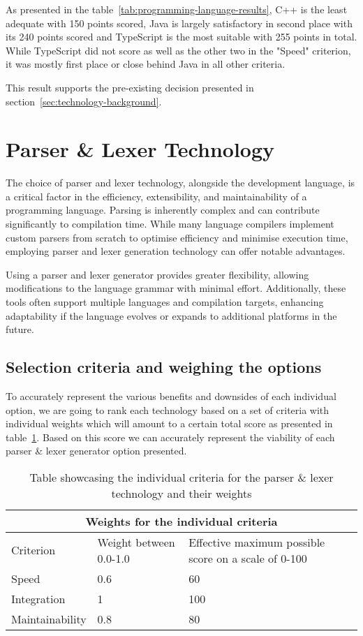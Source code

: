 As presented in the table~\ref{tab:programming-language-results}, C++ is the least adequate with 150 points scored, Java is largely satisfactory in second place with its 240 points scored and TypeScript is the most suitable with 255 points in total. While TypeScript did not score as well as the other two in the "Speed" criterion, it was mostly first place or close behind Java in all other criteria. 

This result supports the pre-existing decision presented in section~\ref{sec:technology-background}.

\section{Parser \& Lexer Technology}

The choice of parser and lexer technology, alongside the development language, is a critical factor in the efficiency, extensibility, and maintainability of a programming language. Parsing is inherently complex and can contribute significantly to compilation time. While many language compilers implement custom parsers from scratch to optimise efficiency and minimise execution time, employing parser and lexer generation technology can offer notable advantages.

Using a parser and lexer generator provides greater flexibility, allowing modifications to the language grammar with minimal effort. Additionally, these tools often support multiple languages and compilation targets, enhancing adaptability if the language evolves or expands to additional platforms in the future.

\subsection{Selection criteria and weighing the options}
\label{sec:parser-and-lexer-technology-selection-criteria}

To accurately represent the various benefits and downsides of each individual option, we are going to rank each technology based on a set of criteria with individual weights which will amount to a certain total score as presented in table~\ref{tab:parser-and-lexer-technology-selection-criteria}. Based on this score we can accurately represent the viability of each parser \& lexer generator option presented.

\begin{table}[H]
	\centering
	\begin{tabular}{ |p{4cm}|p{5cm}|p{5cm}|  }
		\hline
		\multicolumn{3}{|c|}{Weights for the individual criteria} \\
		\hline
		Criterion&Weight between 0.0-1.0&Effective maximum possible score on a scale of 0-100\\
		\hline
		Speed&0.6&60\\
		Integration&1&100\\
		Maintainability&0.8&80\\
		\hline
	\end{tabular}
	\caption{Table showcasing the individual criteria for the parser \& lexer technology and their weights}
	\label{tab:parser-and-lexer-technology-selection-criteria}
\end{table}

